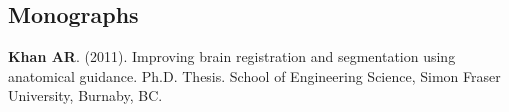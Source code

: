 
\subsection*{Monographs}
\begingroup
\renewcommand{\section}[2]{}%
\begin{thebibliography}{99}

\setcounter{enumi}{0}
 \textbf{Khan AR}. (2011). Improving brain registration and segmentation using anatomical guidance. Ph.D. Thesis.  School of Engineering Science, Simon Fraser University, Burnaby, BC.



\end{thebibliography}
\endgroup
